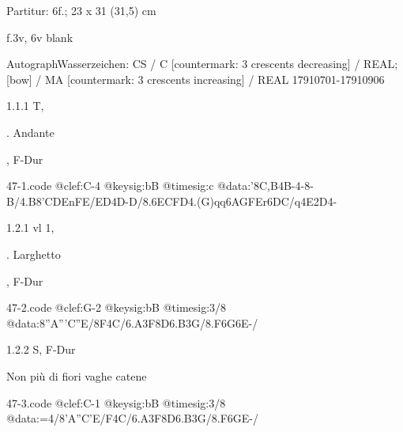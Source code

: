 \documentclass[a4paper, twocolumn, 11pt]{book}
\begin{document}
\par \textcolor{darkblue}{}  Partitur: 6f.; 23 x 31 (31,5) cm\newline \begin{small} f.3v, 6v blank\end{small} \newline Autograph\newline Wasserzeichen: CS / C [countermark: 3 crescents decreasing] / REAL; [bow] / MA [countermark: 3 crescents increasing] / REAL  17910701-17910906
\par 1.1.1  T, \begin{itshape}[No 1 Duetto]. Andante\end{itshape}, F-Dur\newline \begin{footnotesize}  \end{footnotesize}  
\begin{filecontents*}{47-1.code}
@clef:C-4
@keysig:bB
@timesig:c
@data:'{8C,B}4B-4-8-B/4.B8'C{DE}{nFE}/{ED}4D-D/8.6{EC}{FD}4.(G)qq{6AGFE}r{6DC}/q4E2D4-
\end{filecontents*}

\newline %
\par 1.2.1  vl 1, \begin{itshape}[No 23 Rondo]. Larghetto\end{itshape}, F-Dur  
\begin{filecontents*}{47-2.code}
@clef:G-2
@keysig:bB
@timesig:3/8
@data:8''{A'''C''E}/8F4C/{6.A3F8D}{6.B3G}/{8.F6G}6E-/
\end{filecontents*}

\newline %
\par 1.2.2  S, F-Dur\newline \begin{footnotesize} Non più di fiori vaghe catene \end{footnotesize}  
\begin{filecontents*}{47-3.code}
@clef:C-1
@keysig:bB
@timesig:3/8
@data:=4/8'A''C'E/F4C/{6.A3F}8D{6.B3G}/{8.F6G}E-/
\end{filecontents*}
\end{document}
